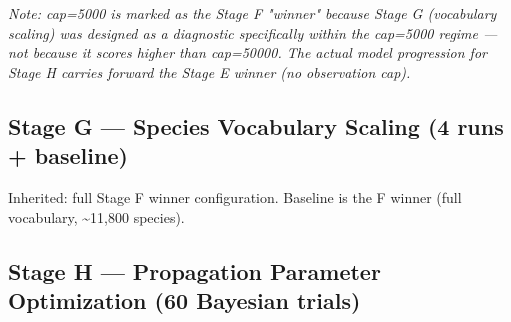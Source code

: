 \emph{Note: cap=5000 is marked as the Stage F "winner" because Stage G (vocabulary scaling) was designed as a diagnostic specifically within the cap=5000 regime --- not because it scores higher than cap=50000. The actual model progression for Stage H carries forward the Stage E winner (no observation cap).}

\subsection{Stage G --- Species Vocabulary Scaling (4 runs + baseline)}
\label{sec:B-7-stage-g-species-vocabulary-scaling-4-run}

Inherited: full Stage F winner configuration. Baseline is the F winner (full vocabulary, \textasciitilde{}11,800 species).

\begin{table}[H]
\centering
\caption{Stage G, species vocabulary scaling (4 runs plus baseline). Absolute scores fall as the vocabulary grows, which is expected --- the task gets harder. The density ratio moves further above 1.0 at the same time, so the sparse quartile is not what the larger vocabularies lose on; all of these runs inherit the Stage F cap, which over-corrects spatial balance in the first place.}
\label{tab:stage-g}
\small
{}
\end{table}

\subsection{Stage H --- Propagation Parameter Optimization (60 Bayesian trials)}
\label{sec:B-8-stage-h-propagation-parameter-optimizati}


